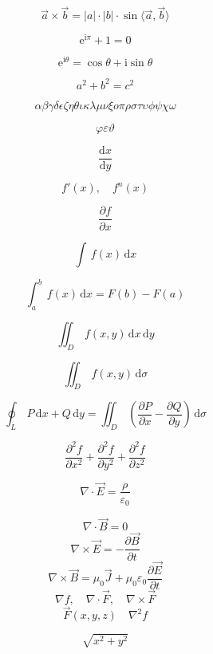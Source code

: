 \documentclass{ctexart}
\begin{document}
\[
\vec{a} \times \vec{b} = |a| \cdot |b| \cdot \sin\langle\vec{a}, \vec{b}\rangle
\]

\[
\mathrm{e}^{\mathrm{i}\pi} + 1 = 0
\]

\[
\mathrm{e}^{\mathrm{i}\theta} = \cos\theta + \mathrm{i}\sin\theta
\]

\[
a^2 + b^2 = c^2
\]

$$\alpha \beta \gamma \delta
  \epsilon \zeta \eta \theta
  \iota \kappa \lambda \mu 
  \nu \xi o \pi 
  \rho \sigma \tau \upsilon 
  \phi \psi \chi \omega $$

$$ \varphi \varepsilon \vartheta $$

\[
\frac{\mathrm{d}x}{\mathrm{d}y}
\]

\[
f'(x), \quad f^{n}(x)
\]

\[
\frac{\partial f}{\partial x}
\]

\[
\int\,f(x)\,\mathrm{d}x
\]

\[
\int_a^b\,f(x)\,\mathrm{d}x = F(b) - F(a)
\]

\[
\iint_D\,f(x, y)\,\mathrm{d}x\,\mathrm{d}y
\]

\[
\iint_D\,f(x, y)\,\mathrm{d}\sigma
\]

\[
\oint_L\,P\,\mathrm{d}x + Q\,\mathrm{d}y = \iint_D\,\left(\frac{\partial{P}}{\partial{x}} - \frac{\partial{Q}}{\partial{y}}\right)\,\mathrm{d}\sigma
\]

\newpage
\[
\frac{\partial^2 f}{\partial x^2}
+ \frac{\partial^2 f}{\partial y^2}
+ \frac{\partial^2 f}{\partial z^2}
\] 

\[
\nabla \cdot \vec{E} = \frac{\rho}{\varepsilon_0}
\]

\[
\nabla \cdot \vec{B} = 0
\]
\[
\nabla \times \vec{E} = -\frac{\partial \vec{B}}{\partial t}
\]
\[
\nabla \times \vec{B} = \mu_0 \vec{J} + \mu_0 \varepsilon_0 \frac{\partial \vec{E}}{\partial t}
\]
\[
\nabla f,\quad
\nabla \cdot \vec{F},\quad
\nabla \times \vec{F}
\]
\[
\vec{F}(x,y,z)\quad
\nabla^2 f
\]

\newpage
{}
\[
\sqrt{x^2+y^2}
\]
\end{document}
